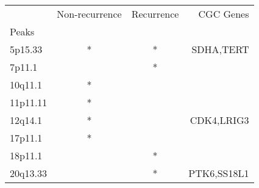 \begin{tabular}{lccr}
\toprule
{} & Non-recurrence & Recurrence &    CGC Genes \\
Peaks    &                &            &              \\
\midrule
5p15.33  &              * &          * &    SDHA,TERT \\
7p11.1   &                &          * &              \\
10q11.1  &              * &            &              \\
11p11.11 &              * &            &              \\
12q14.1  &              * &            &   CDK4,LRIG3 \\
17p11.1  &              * &            &              \\
18p11.1  &                &          * &              \\
20q13.33 &                &          * &  PTK6,SS18L1 \\
\bottomrule
\end{tabular}
